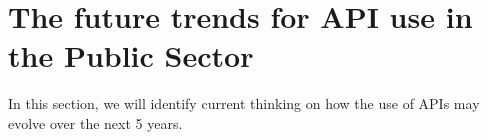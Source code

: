 \chapter{The future trends for API use in the Public Sector}

\ifpdf
    \graphicspath{{Chapter4/Figs/Raster/}{Chapter4/Figs/PDF/}{Chapter4/Figs/}}
\else
    \graphicspath{{Chapter4/Figs/Vector/}{Chapter4/Figs/}}
\fi

In this section, we will identify current thinking on how the use of APIs may
evolve over the next 5 years.
